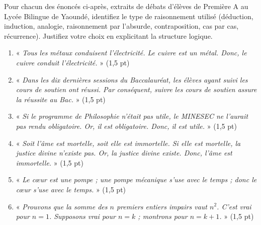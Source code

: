 \documentclass[11pt]{article}
\begin{document}
\begin{exercice}
Pour chacun des énoncés ci-après, extraits de débats d'élèves de Première A au Lycée Bilingue de Yaoundé, identifiez le type de raisonnement utilisé (déduction, induction, analogie, raisonnement par l'absurde, contraposition, cas par cas, récurrence). Justifiez votre choix en explicitant la structure logique.
\begin{enumerate}
    \item « \textit{Tous les métaux conduisent l'électricité. Le cuivre est un métal. Donc, le cuivre conduit l'électricité.} » (1,5 pt)
    \item « \textit{Dans les dix dernières sessions du Baccalauréat, les élèves ayant suivi les cours de soutien ont réussi. Par conséquent, suivre les cours de soutien assure la réussite au Bac.} » (1,5 pt)
    \item « \textit{Si le programme de Philosophie n'était pas utile, le MINESEC ne l'aurait pas rendu obligatoire. Or, il est obligatoire. Donc, il est utile.} » (1,5 pt)
    \item « \textit{Soit l'âme est mortelle, soit elle est immortelle. Si elle est mortelle, la justice divine n'existe pas. Or, la justice divine existe. Donc, l'âme est immortelle.} » (1,5 pt)
    \item « \textit{Le cœur est une pompe ; une pompe mécanique s'use avec le temps ; donc le cœur s'use avec le temps.} » (1,5 pt)
    \item « \textit{Prouvons que la somme des $n$ premiers entiers impairs vaut $n^2$. C'est vrai pour $n=1$. Supposons vrai pour $n=k$ ; montrons pour $n=k+1$.} » (1,5 pt)
\end{enumerate}
\end{exercice}
\end{document}

